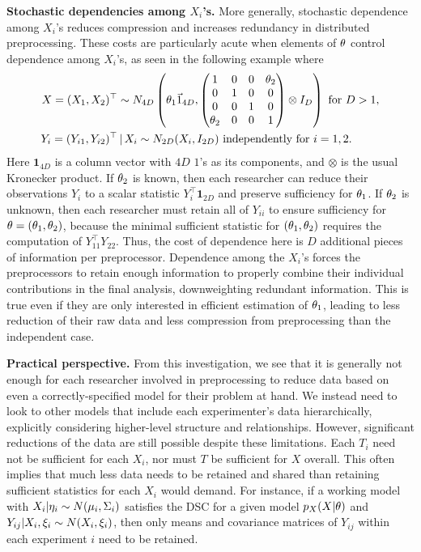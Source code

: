 \medskip
\noindent
{\bf Stochastic dependencies among $X_i$'s.} More generally,  stochastic  dependence among $X_i$'s    reduces compression and increases redundancy in distributed preprocessing.
These costs are particularly acute when elements of $\theta$ control dependence among $X_i$'s, as seen in the following example where
\begin{align}
 \nonumber
 X = (X_1, X_2)^\top &\sim N_{4D}\left(\theta_1 \vec 1_{4D},  \begin{pmatrix} 
1 & 0 & 0 & \theta_2 \\
0 & 1 & 0 & 0 \\
0 & 0 & 1 & 0 \\
\theta_2 & 0 & 0 & 1
\end{pmatrix} \otimes I_{D} \right)\mbox{ for }D > 1, \\
 \nonumber
 Y_i = (Y_{i1}, Y_{i2})^\top &\, | \, X_i\sim N_{2D}(X_i, I_{2D})  \mbox{ independently for\ } i=1,2.
\end{align}
Here $\bm 1_{4D}$ is a column vector with $4D$ $1$'s as its components, and $\otimes$ is the usual Kronecker product.  
If $\theta_2$ is known, then each researcher can reduce their observations $Y_i$ to a scalar statistic $Y_i^\top \bm 1_{2D}$ and preserve sufficiency for $\theta_1$.
If $\theta_2$ is unknown, then each researcher must retain all of $Y_{ii}$ to ensure sufficiency for $\theta = (\theta_1, \theta_2)$, because the minimal sufficient statistic for $(\theta_1, \theta_2)$ requires the computation of $Y_{11}^\top Y_{22}$.
Thus, the cost of dependence here is $D$ additional pieces of information per preprocessor.
%
Dependence among the $X_i$'s forces the preprocessors to retain enough information to properly combine their individual contributions in the final analysis, downweighting redundant information.
This is true even if they are only interested in efficient estimation of $\theta_1$, leading to less reduction of their raw data and less compression from preprocessing than the independent case.


\medskip
\noindent
{\bf Practical perspective.}
From this investigation, we see that it is generally not enough for each researcher involved in preprocessing to reduce data based on even a correctly-specified model for their problem at hand.
We instead need to look to other models that include each experimenter's data hierarchically, explicitly considering higher-level structure and relationships.
However, significant reductions of the data are still possible despite these limitations.
Each $T_i$ need not be sufficient for each $X_i$, nor must $T$ be sufficient for $X$ overall.
This often implies that much less data needs to be retained and shared than  retaining sufficient statistics for each $X_i$ would demand.
For instance, if a working model with $X_i | \eta_i \sim N(\mu_i, \Sigma_i)$ satisfies the DSC for a given model $p_X(X | \theta)$ and $Y_{ij} | X_i, \xi_i \sim N(X_i, \xi_i)$, then only means and covariance matrices of $Y_{ij}$ within each experiment $i$ need to be retained.

